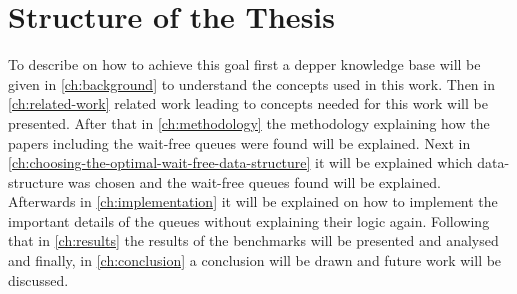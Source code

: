 \section{Structure of the Thesis}\label{sec:structure-of-the-thesis}
To describe on how to achieve this goal first a depper knowledge base will be given in \cref{ch:background} to understand the concepts used in this work. Then in \cref{ch:related-work} related work leading to concepts needed for this work will be presented. After that in \cref{ch:methodology} the methodology explaining how the papers including the wait-free queues were found will be explained. Next in \cref{ch:choosing-the-optimal-wait-free-data-structure} it will be explained which data-structure was chosen and the wait-free queues found will be explained. Afterwards in \cref{ch:implementation} it will be explained on how to implement the important details of the queues without explaining their logic again. Following that in \cref{ch:results} the results of the benchmarks will be presented and analysed and finally, in \cref{ch:conclusion} a conclusion will be drawn and future work will be discussed.